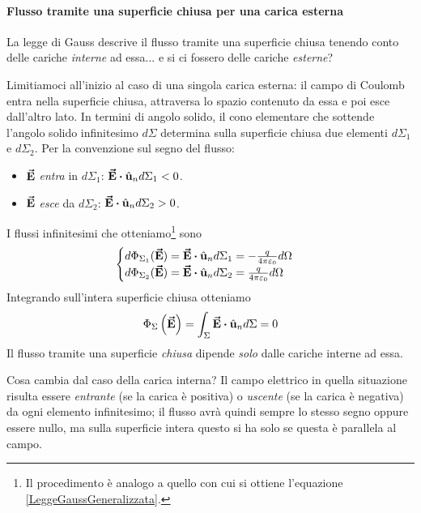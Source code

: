 \paragraph{Flusso tramite una superficie chiusa per una carica esterna}
La legge di Gauss descrive il flusso tramite una superficie chiusa tenendo conto delle cariche \textit{interne} ad essa... e si ci fossero delle cariche \textit{esterne}?

Limitiamoci all'inizio al caso di una singola carica esterna: il campo di Coulomb entra nella superficie chiusa, attraversa lo spazio contenuto da essa e poi esce dall'altro lato. In termini di angolo solido, il cono elementare che sottende l'angolo solido infinitesimo $d\Sigma$ determina sulla superficie chiusa due elementi $d\Sigma_1$ e $d\Sigma_2$. Per la convenzione sul segno del flusso:
\begin{itemize}
	\item $\vb*{\va{E}}$ \textit{entra} in $d\Sigma_1$: $\vba{E}\vdot \vbh{u}_n d\Sigma_1<0$.
	\item $\vb*{\va{E}}$ \textit{esce} da $d\Sigma_2$: $\vba{E}\vdot \vbh{u}_n d\Sigma_2>0$.
\end{itemize}
I flussi infinitesimi che otteniamo\footnote{Il procedimento è analogo a quello con cui si ottiene l'equazione \ref{LeggeGaussGeneralizzata}.} sono
\begin{equation*}
	\begin{cases}
		d\Phi_{\Sigma_1}(\vba{E})=\vba{E}\vdot \vbh{u}_n d\Sigma_1=-\frac{q}{4\pi\epsilon_0}d\Omega\\
		d\Phi_{\Sigma_2}(\vba{E})=\vba{E}\vdot \vbh{u}_n d\Sigma_2=\frac{q}{4\pi\epsilon_0}d\Omega
	\end{cases}
\end{equation*}
Integrando sull'intera superficie chiusa otteniamo
\begin{equation}
	\Phi_\Sigma\left(\vba{E}\right)=\int_{\Sigma}\vba{E}\vdot\vbh{u}_nd\Sigma=0
\end{equation}
Il flusso tramite una superficie \textit{chiusa} dipende \textit{solo} dalle cariche interne ad essa.
\begin{observe}
	Cosa cambia dal caso della carica interna? Il campo elettrico in quella situazione risulta essere \textit{entrante} (se la carica è positiva) o \textit{uscente} (se la carica è negativa) da ogni elemento infinitesimo; il flusso avrà quindi sempre lo stesso segno oppure essere nullo, ma sulla superficie intera questo si ha solo se questa è parallela al campo.   
\end{observe}
